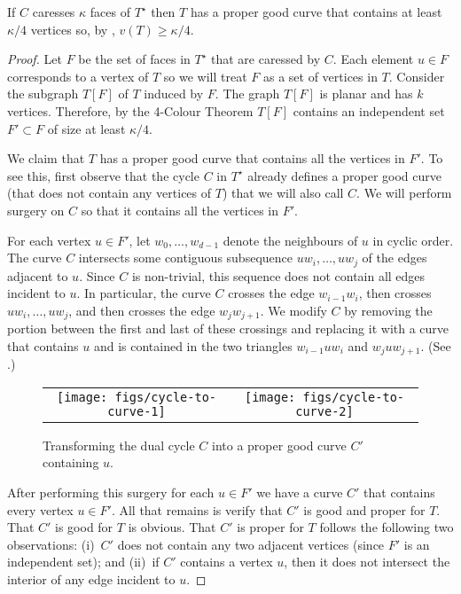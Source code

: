 \documentclass{patmorin}
\newcommand{\dual}[1]{{#1}^\star}
\begin{document}
\begin{lem}
   If $C$ caresses $\kappa$ faces of $\dual{T}$ then $T$ has a proper
   good curve that contains at least $\kappa/4$ vertices so, by
   , $v(T)\ge \kappa/4$.
\end{lem}

\begin{proof}
  Let $F$ be the set of faces in $\dual{T}$ that are caressed by $C$. Each
  element $u\in F$ corresponds to a vertex of $T$ so we will treat $F$
  as a set of vertices in $T$.  Consider the subgraph $T[F]$ of $T$
  induced by $F$.  The graph $T[F]$ is planar and has $k$ vertices. Therefore,
  by the 4-Colour Theorem \cite{seymour.ea:XX} $T[F]$ contains an independent
  set $F'\subset F$ of size at least $\kappa/4$.

  We claim that $T$ has a proper good curve that contains all the vertices
  in $F'$.  To see this, first observe that the cycle $C$ in $\dual{T}$
  already defines a proper good curve (that does not contain any vertices
  of $T$) that we will also call $C$.  We will perform surgery on $C$
  so that it contains all the vertices in $F'$.

  For each vertex $u\in F'$, let $w_0,\ldots,w_{d-1}$ denote the
  neighbours of $u$ in cyclic order.  The curve $C$ intersects some
  contiguous subsequence $uw_i,\ldots,uw_j$ of the edges adjacent
  to $u$.  Since $C$ is non-trivial, this sequence does not contain all
  edges incident to $u$. In particular, the curve $C$ crosses the edge
  $w_{i-1}w_i$, then crosses
  $uw_i,\ldots,uw_j$, and then crosses the edge $w_j w_{j+1}$.  We modify
  $C$ by removing the portion between the first and last of these crossings
  and replacing it with a curve that contains $u$ and is contained in the
  two triangles $w_{i-1}uw_i$ and $w_juw_{j+1}$. (See .)

  \begin{figure}
     \begin{center}
	\begin{tabular}{cc}
		\texttt{[image: figs/cycle-to-curve-1]} &
		\texttt{[image: figs/cycle-to-curve-2]}
	\end{tabular}
     \end{center}
     \caption{Transforming the dual cycle $C$ into a proper good curve $C'$ containing $u$.}
  \end{figure}

  After performing this surgery for each $u\in F'$ we have a curve $C'$
  that contains every vertex $u\in F'$.  All that remains is verify that
  $C'$ is good and proper for $T$. That $C'$ is good for $T$ is
  obvious.  That $C'$ is proper for $T$ follows the following two observations:
  (i)~$C'$ does not contain any two adjacent vertices (since $F'$ is an
  independent set); and (ii)~if $C'$ contains a vertex $u$, then it does
  not intersect the interior of any edge incident to $u$.
\end{proof}
\end{document}
